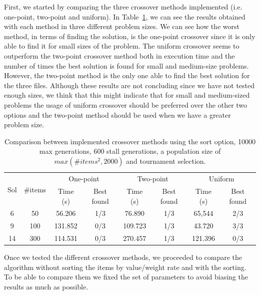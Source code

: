 \documentclass[anon]{CI}
\begin{document}
First, we started by comparing the three crossover methods implemented (i.e. one-point, two-point and uniform). In Table~\ref{tab:comparison}, we can see the results obtained with each method in three different problem sizes. We can see how the worst method,  in terms of finding the solution, is the one-point crossover since it is only able to find it for small sizes of the problem. The uniform crossover seems to outperform the two-point crossover method both in execution time and the number of times the best solution is found for small and medium-size problems. However, the two-point method is the only one able to find the best solution for the three files. Although these results are not concluding since we have not tested enough sizes, we think that this might indicate that for small and medium-sized problems the usage of uniform crossover should be preferred over the other two options and the two-point method should be used when we have a greater problem size.

\begin{table}[htbp]
    \centering
    \begin{adjustbox}{max width=\textwidth}
    \begin{tabular}{|c|c|c|c|c|c|c|c|}
    \hline 
    \multirow{2}{*}{Sol} & \multirow{2}{*}{\#items} & \multicolumn{2}{c|}{One-point } & \multicolumn{2}{c|}{Two-point} & \multicolumn{2}{c|}{Uniform}\\
    \cline{3-8}
     &  & Time (s) & Best found & Time (s) & Best found & Time (s) & Best found\\
    \hline 
    6 & 50 & 56.206 & 1/3 & 76.890 & 1/3 & 65,544 & 2/3\\
    \hline 
    9 & 100 & 131.852 & 0/3 & 109.723 & 1/3 & 43.720 & 3/3\\
    \hline 
    14 & 300 & 114.531 & 0/3 & 270.457 & 1/3 & 121.396 & 0/3\\
    \hline 
    \end{tabular}
    \end{adjustbox}
    \caption{Comparison between implemented crossover methods using the sort option,
    10000 max generations, 600 stall generations, a population size of
    $max(\#items^{2},2000)$ and tournament selection.}
    \label{tab:comparison}
\end{table}

Once we tested the different crossover methods, we proceeded to compare the algorithm without sorting the items by value/weight rate and with the sorting. To be able to compare them we fixed the set of parameters to avoid biasing the results as much as possible.
\end{document}
